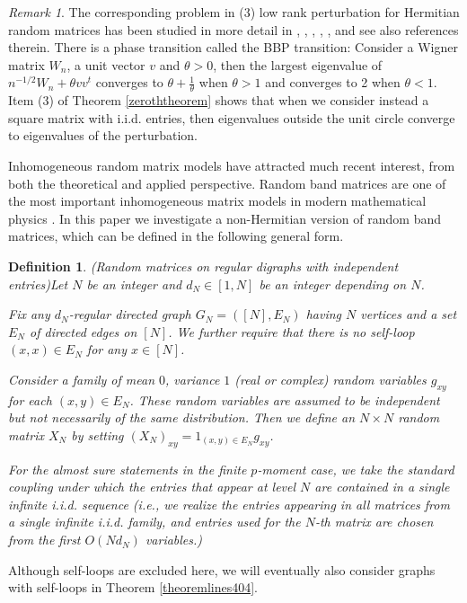 \documentclass[11pt,reqno]{amsart}
\theoremstyle{plain}
\newtheorem{Definition}[theorem]{Definition}
\theoremstyle{remark}
\newtheorem{remark}[theorem]{Remark}
\numberwithin{equation}{section}
\begin{document}
\begin{remark}

 The corresponding problem in (3) low rank perturbation  for Hermitian random matrices has been studied in more detail in \cite{peche2006largest}, \cite{capitaine2012central}, \cite{pizzo2013finite}, \cite{feral2007largest}, \cite{benaych2011eigenvalues}, and see also references therein. There is a phase transition called the BBP transition: Consider a Wigner matrix $W_n$, a unit vector $v$ and $\theta>0$, then the largest eigenvalue of $n^{-1/2}W_n+\theta vv^t$ converges to $\theta+\frac{1}{\theta}$ when $\theta>1$ and converges to 2 when $\theta<1$. Item (3) of Theorem \ref{zeroththeorem} shows that when we consider instead a square matrix with i.i.d. entries, then eigenvalues outside the unit circle converge to eigenvalues of the perturbation. 
 
 
\end{remark}


Inhomogeneous random matrix models have attracted much recent interest, from both the theoretical and applied perspective. Random band matrices are one of the most important inhomogeneous matrix models in modern mathematical physics \cite{bourgade2018random}. In this paper we investigate a non-Hermitian version of random band matrices, which can be defined in the following general form.

\begin{Definition}(Random matrices on regular digraphs with independent entries)\label{definebandmatrix}
Let $N$ be an integer and $d_N\in [1,N]$ be an integer depending on $N$. 

Fix any $d_N$-regular directed graph $G_N=([N],E_N)$ having $N$ vertices and a set $E_N$ of directed edges on $[N]$. 
We further require that there is no self-loop $(x,x)\in E_N$ for any $x\in [N]$.

Consider a family of mean $0$, variance $1$ (real or complex) random variables $g_{xy}$ for each $(x,y)\in E_N$. These random variables are assumed to be independent but not necessarily of the same distribution. Then we define an $N\times N$ random matrix $X_N$ by setting $(X_N)_{xy}=1_{(x,y)\in E_N}g_{xy}$. 

For the almost sure statements in the finite $p$-moment case, we take the standard coupling under which the entries that appear at level $N$ are contained in a single infinite i.i.d. sequence (i.e., we realize the entries appearing in all matrices from a single infinite i.i.d. family, and entries used for the $N$-th matrix are chosen from the first $O(Nd_N)$ variables.)


\end{Definition}Although self-loops are excluded here, we will eventually also consider graphs with self-loops in Theorem \ref{theoremlines404}.
\end{document}
